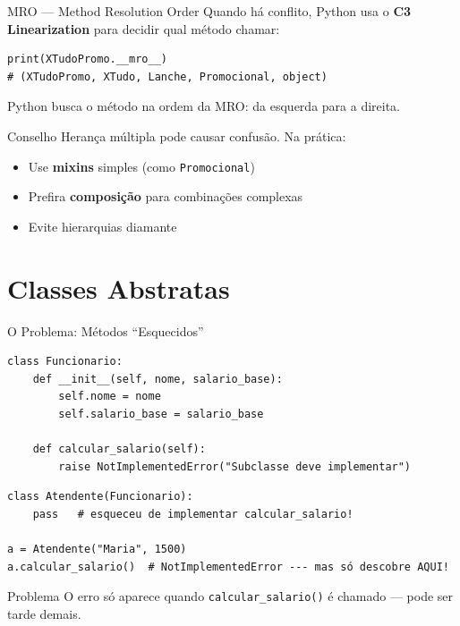 \documentclass[aspectratio=169]{beamer}
\begin{document}
\begin{frame}[fragile,shrink=10]{MRO --- Method Resolution Order}
  Quando há conflito, Python usa o \textbf{C3 Linearization} para decidir qual método chamar:

  \begin{lstlisting}
print(XTudoPromo.__mro__)
# (XTudoPromo, XTudo, Lanche, Promocional, object)
  \end{lstlisting}

  Python busca o método na ordem da MRO: da esquerda para a direita.

  \begin{alertblock}{Conselho}
    Herança múltipla pode causar confusão. Na prática:
    \begin{itemize}
      \item Use \textbf{mixins} simples (como \texttt{Promocional})
      \item Prefira \textbf{composição} para combinações complexas
      \item Evite hierarquias diamante
    \end{itemize}
  \end{alertblock}
\end{frame}

\section{Classes Abstratas}

\begin{frame}[fragile,shrink=10]{O Problema: Métodos ``Esquecidos''}
  \begin{lstlisting}
class Funcionario:
    def __init__(self, nome, salario_base):
        self.nome = nome
        self.salario_base = salario_base

    def calcular_salario(self):
        raise NotImplementedError("Subclasse deve implementar")
  \end{lstlisting}

  \begin{lstlisting}
class Atendente(Funcionario):
    pass   # esqueceu de implementar calcular_salario!

a = Atendente("Maria", 1500)
a.calcular_salario()  # NotImplementedError --- mas só descobre AQUI!
  \end{lstlisting}

  \begin{alertblock}{Problema}
    O erro só aparece quando \texttt{calcular\_salario()} é chamado --- pode ser tarde demais.
  \end{alertblock}
\end{frame}
\end{document}
